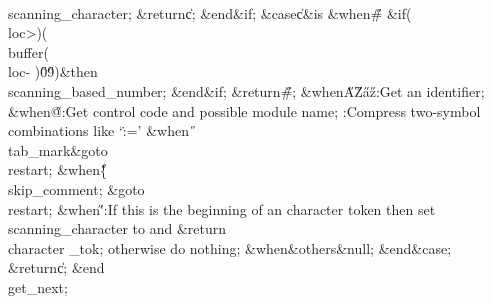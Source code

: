 \\{scanning\_character}\?\K\?;\5
\?\&{return}\?\8\|c;\2\6
\&{end}\8\2\&{if}\1;\6
\&{case}\1\8\|c\1\8\&{is}\8\6
\4\&{when}\8\H{\#}\KR\6
\&{if}\1\1\?\8\1(\?\\{loc}\?>\?\2)\ANT\1(\?\\{buffer}\?\1(\?\\{loc}\?-\?%
\2)\in\?\H{0}\?\to\?\H{9}\?\2)\?\2\8\&{then}\6
\\{scanning\_based\_number}\?\K\?;\2\6
\&{end}\8\2\&{if}\1;\6
\?\&{return}\?\8\H{\#};\6
\4\&{when}\8\H{A}\?\to\?\H{Z}\?\mathrel{\.|}\?\H{a}\?\to\?\H{z}\KR\8:Get
an identifier\X;\6
\4\&{when}\8\H{@}\KR\8:Get control code and possible module name\X;\6
\hbox{\4}:Compress two-symbol combinations like `\.{:=}'\X\6
\4\&{when}\8\H{\ }\?\mathrel{\.|}\?\\{tab\_mark}\KR\8\&{goto}\8\\{restart};%
\6
\4\&{when}\8\H{\{}\KR\8\\{skip\_comment};\5
\&{goto}\8\\{restart};\6
\4\&{when}\8\H{\'}\KR\8:If this is the beginning of an character token
then set \\{scanning\_character} to  and \?\&{return}\?\8\\{character%
\_tok}; otherwise do nothing\X;\6
\4\&{when}\8\&{others}\8\KR\8\&{null};\2\6
\4\2\&{end}\8\&{case};\6
\?\&{return}\?\8\|c;\2\6
\&{end}\8\\{get\_next};\par
\fi

